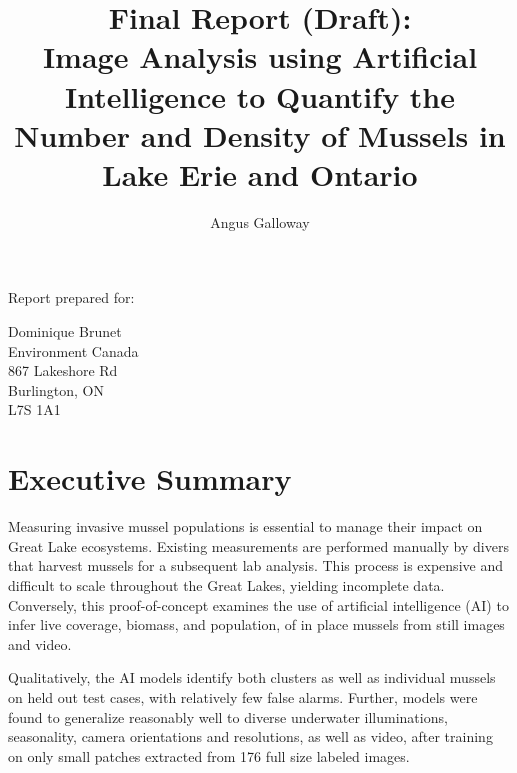 \documentclass[11pt]{article} %
\title{Final Report (Draft): \\
Image Analysis using Artificial Intelligence to
Quantify the Number and Density of Mussels in Lake Erie and Ontario}
\author{Angus Galloway}
\begin{document}
\maketitle

\thispagestyle{empty}

\vspace{5cm}

\begin{centering}

Report prepared for:

\vspace{1cm}

Dominique Brunet \\ 
Environment Canada \\ 
867 Lakeshore Rd \\
Burlington, ON \\
L7S 1A1 

\end{centering}

\clearpage


\setcounter{page}{1}

\section*{Executive Summary}

Measuring invasive mussel populations is essential to manage their impact on 
Great Lake ecosystems. Existing measurements are performed manually by divers 
that harvest mussels for a subsequent lab analysis. This process is expensive 
and difficult to scale throughout the Great Lakes, yielding incomplete data. 
Conversely, this proof-of-concept examines the use of artificial intelligence
(AI) to infer live coverage, biomass, and population, of in place mussels from
still images and video.

Qualitatively, the AI models identify both clusters as well as individual 
mussels on held out test cases, with relatively few false alarms. Further, 
models were found to generalize reasonably well to diverse underwater 
illuminations, seasonality, camera orientations and resolutions, as well as 
video, after training on only small patches extracted from 176 full size 
labeled images. 
\end{document}

